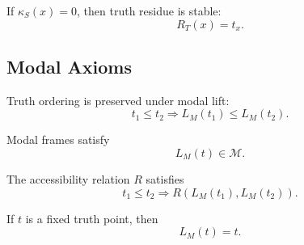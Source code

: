 \begin{axiom}
If $\kappa_S(x) = 0$, then truth residue is stable:
\[
R_T(x) = t_x.
\]
\end{axiom}


\subsection{Modal Axioms}

\begin{axiom}
Truth ordering is preserved under modal lift:
\[
t_1 \le t_2 \Rightarrow L_M(t_1) \le L_M(t_2).
\]
\end{axiom}

\begin{axiom}
Modal frames satisfy
\[
L_M(t) \in \mathcal{M}.
\]
\end{axiom}

\begin{axiom}
The accessibility relation $R$ satisfies
\[
t_1 \le t_2 \Rightarrow R(L_M(t_1), L_M(t_2)).
\]
\end{axiom}

\begin{axiom}
If $t$ is a fixed truth point, then
\[
L_M(t) = t.
\]
\end{axiom}
